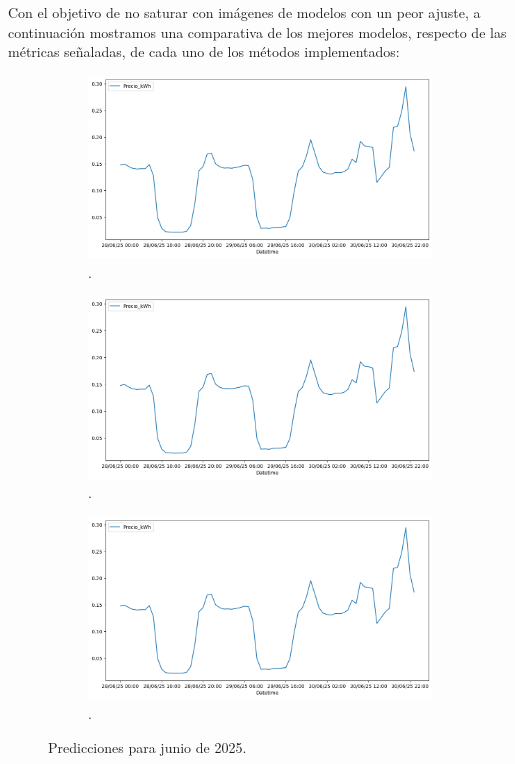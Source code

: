 Con el objetivo de no saturar con imágenes de modelos con un peor ajuste, a continuación mostramos una comparativa de los mejores modelos, respecto de las métricas señaladas, de cada uno de los métodos implementados:
\begin{figure}[H]
\centering
\begin{subfigure}[b]{0.3\textwidth}
\centering
\includegraphics[width=\textwidth]{figuras/histoico.png}
\caption[Predicción mediante SARIMAX]{.}
\label{PrediccionSarimax}
\end{subfigure}
\begin{subfigure}[b]{0.3\textwidth}
\centering
\includegraphics[width=\textwidth]{figuras/histoico.png}
\caption[Predicción mediante XGBoost]{.}
\label{PrediccionXGBoost}
\end{subfigure}
\begin{subfigure}[b]{0.3\textwidth}
\centering
\includegraphics[width=\textwidth]{figuras/histoico.png}
\caption[Predicción mediante TFT]{.}
\label{PrediccionTFT}
\end{subfigure}
\caption{Predicciones para junio de 2025.}
\label{PrediccionesLuz}
\end{figure}
%
